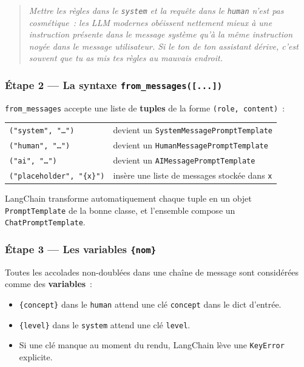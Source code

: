 \documentclass[11pt,a4paper]{article}
\begin{document}
\begin{quote}\itshape
Mettre les \emph{règles} dans le \texttt{system} et la \emph{requête} dans
le \texttt{human} n'est pas cosmétique~: les LLM modernes obéissent
nettement mieux à une instruction présente dans le message système qu'à la
même instruction noyée dans le message utilisateur. Si le ton de ton
assistant dérive, c'est souvent que tu as mis tes règles au mauvais endroit.
\end{quote}

\subsubsection*{Étape 2 — La syntaxe \texttt{from\_messages([...])}}

\texttt{from\_messages} accepte une liste de \textbf{tuples} de la forme
\texttt{(role, content)}~:

\begin{center}
\begin{tabular}{ll}
\texttt{("system", "\dots")}     & devient un \texttt{SystemMessagePromptTemplate} \\
\texttt{("human",  "\dots")}     & devient un \texttt{HumanMessagePromptTemplate} \\
\texttt{("ai",     "\dots")}     & devient un \texttt{AIMessagePromptTemplate} \\
\texttt{("placeholder", "\{x\}")} & insère une liste de messages stockée dans \texttt{x} \\
\end{tabular}
\end{center}

LangChain transforme automatiquement chaque tuple en un objet
\texttt{PromptTemplate} de la bonne classe, et l'ensemble compose un
\texttt{ChatPromptTemplate}.

\subsubsection*{Étape 3 — Les variables \texttt{\{nom\}}}

Toutes les accolades non-doublées dans une chaîne de message sont
considérées comme des \textbf{variables}~:

\begin{itemize}[leftmargin=*]
  \item \texttt{\{concept\}} dans le \texttt{human} attend une clé
        \texttt{concept} dans le dict d'entrée.
  \item \texttt{\{level\}} dans le \texttt{system} attend une clé
        \texttt{level}.
  \item Si une clé manque au moment du rendu, LangChain lève une
        \texttt{KeyError} explicite.
\end{itemize}
\end{document}
